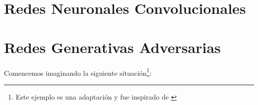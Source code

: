 {{%

\section{Redes Neuronales Convolucionales}\label{sec:redes-neuronales-convolucionales}
{
}  %

\section{Redes Generativas Adversarias}\label{sec:redes-generativas-adversarias-GAN}
{
Comencemos imaginando la siguiente situación\footnote{Este ejemplo es una adaptación y fue inspirado de \cite[min. 4:32]{santana2017creando}}:

}}}

